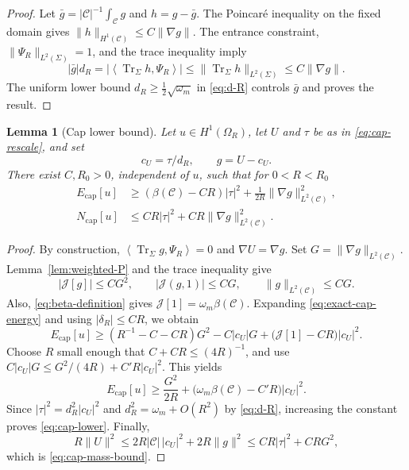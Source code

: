 \documentclass[11pt,a4paper]{article}
\numberwithin{equation}{section}
\theoremstyle{paperplain}
\newtheorem{lemma}[theorem]{Lemma}
\theoremstyle{remark}
\newcommand{\C}{\mathcal{C}}
\newcommand{\Tr}{\operatorname{Tr}}
\newcommand{\ip}[2]{\left\langle#1,#2\right\rangle}
\begin{document}
\begin{proof}
Let $\bar g=|\C|^{-1}\int_{\C} g$ and $h=g-\bar g$. The Poincar\'e
inequality on the fixed domain gives
$\|h\|_{H^1(\C)}\le C\|\nabla g\|$. The entrance constraint,
$\|\Psi_R\|_{L^2(\Sigma)}=1$, and the trace inequality imply
\[
 |\bar g|d_R
 =\left|\ip{\Tr_\Sigma h}{\Psi_R}\right|
 \le\|\Tr_\Sigma h\|_{L^2(\Sigma)}
 \le C\|\nabla g\|.
\]
The uniform lower bound $d_R\ge\frac12\sqrt{\omega_m}$ in \eqref{eq:d-R}
controls $\bar g$ and proves the result.
\end{proof}

\begin{lemma}[Cap lower bound]\label{lem:cap}
Let $u\in H^1(\Omega_R)$, let $U$ and $\tau$ be as in
\eqref{eq:cap-rescale}, and set
\begin{equation}\label{eq:c-g-definition}
 c_U=\tau/d_R,\qquad g=U-c_U.
\end{equation}
There exist $C,R_0>0$, independent of $u$, such that for $0<R<R_0$
\begin{align}
 E_{\mathrm{cap}}[u]&\ge(\beta(\C)-CR)|\tau|^2
                   +\frac1{2R}\|\nabla g\|_{L^2(\C)}^2,
 \label{eq:cap-lower}\\
 N_{\mathrm{cap}}[u]&\le CR|\tau|^2+CR\|\nabla g\|_{L^2(\C)}^2.
 \label{eq:cap-mass-bound}
\end{align}
\end{lemma}

\begin{proof}
By construction, $\ip{\Tr_\Sigma g}{\Psi_R}=0$ and $\nabla U=\nabla g$. Set
$G=\|\nabla g\|_{L^2(\C)}$. Lemma~\ref{lem:weighted-P} and the trace
inequality give
\[
 |\mathcal J[g]|\le CG^2,\qquad |\mathcal J(g,1)|\le CG,
 \qquad \|g\|_{L^2(\C)}\le CG.
\]
Also, \eqref{eq:beta-definition} gives $\mathcal J[1]=\omega_m\beta(\C)$.
Expanding \eqref{eq:exact-cap-energy} and using $|\delta_R|\le CR$, we obtain
\[
 E_{\mathrm{cap}}[u]
 \ge (R^{-1}-C-CR)G^2-C|c_U|G+\bigl(\mathcal J[1]-CR\bigr)|c_U|^2.
\]
Choose $R$ small enough that $C+CR\le(4R)^{-1}$, and use
$C|c_U|G\le G^2/(4R)+C'R|c_U|^2$. This yields
\[
 E_{\mathrm{cap}}[u]\ge\frac{G^2}{2R}
          +\bigl(\omega_m\beta(\C)-C'R\bigr)|c_U|^2.
\]
Since $|\tau|^2=d_R^2|c_U|^2$ and $d_R^2=\omega_m+O(R^2)$ by
\eqref{eq:d-R}, increasing the constant proves \eqref{eq:cap-lower}.
Finally,
\[
 R\|U\|^2\le2R|\C|\,|c_U|^2+2R\|g\|^2\le CR|\tau|^2+CRG^2,
\]
which is \eqref{eq:cap-mass-bound}.
\end{proof}
\end{document}
